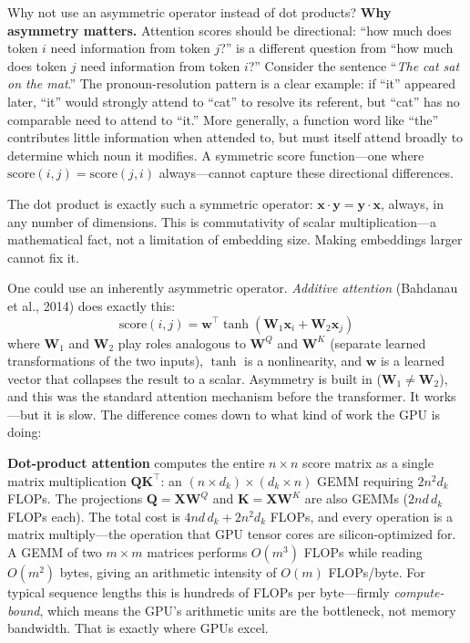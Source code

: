 \begin{whynotbox}{Why not use an asymmetric operator instead of dot products?}
\textbf{Why asymmetry matters.}\hspace{1em} Attention scores should be directional: ``how much does token $i$ need information from token $j$?'' is a different question from ``how much does token $j$ need information from token $i$?'' Consider the sentence ``\emph{The cat sat on the mat}.'' The pronoun-resolution pattern is a clear example: if ``it'' appeared later, ``it'' would strongly attend to ``cat'' to resolve its referent, but ``cat'' has no comparable need to attend to ``it.'' More generally, a function word like ``the'' contributes little information when attended to, but must itself attend broadly to determine which noun it modifies. A symmetric score function---one where $\text{score}(i,j) = \text{score}(j,i)$ always---cannot capture these directional differences.

The dot product is exactly such a symmetric operator: $\mathbf{x} \cdot \mathbf{y} = \mathbf{y} \cdot \mathbf{x}$, always, in any number of dimensions. This is commutativity of scalar multiplication---a mathematical fact, not a limitation of embedding size. Making embeddings larger cannot fix it.

One could use an inherently asymmetric operator. \emph{Additive attention} (Bahdanau et al., 2014) does exactly this:
\[
\text{score}(i, j) = \mathbf{w}^\top \tanh(\mathbf{W}_1 \mathbf{x}_i + \mathbf{W}_2 \mathbf{x}_j)
\]
where $\mathbf{W}_1$ and $\mathbf{W}_2$ play roles analogous to $\mathbf{W}^Q$ and $\mathbf{W}^K$ (separate learned transformations of the two inputs), $\tanh$ is a nonlinearity, and $\mathbf{w}$ is a learned vector that collapses the result to a scalar. Asymmetry is built in ($\mathbf{W}_1 \neq \mathbf{W}_2$), and this was the standard attention mechanism before the transformer. It works---but it is slow. The difference comes down to what kind of work the GPU is doing:

%
\textbf{Dot-product attention} computes the entire $n \times n$ score matrix as a single matrix multiplication $\mathbf{Q}\mathbf{K}^\top$: an $(n \times d_k) \times (d_k \times n)$ GEMM requiring $2n^2 d_k$ FLOPs. The projections $\mathbf{Q} = \mathbf{X}\mathbf{W}^Q$ and $\mathbf{K} = \mathbf{X}\mathbf{W}^K$ are also GEMMs ($2nd\,d_k$ FLOPs each). The total cost is $4nd\,d_k + 2n^2 d_k$ FLOPs, and every operation is a matrix multiply---the operation that GPU tensor cores are silicon-optimized for. A GEMM of two $m \times m$ matrices performs $O(m^3)$ FLOPs while reading $O(m^2)$ bytes, giving an arithmetic intensity of $O(m)$ FLOPs/byte. For typical sequence lengths this is hundreds of FLOPs per byte---firmly \emph{compute-bound}, which means the GPU's arithmetic units are the bottleneck, not memory bandwidth. That is exactly where GPUs excel.


\end{whynotbox}

